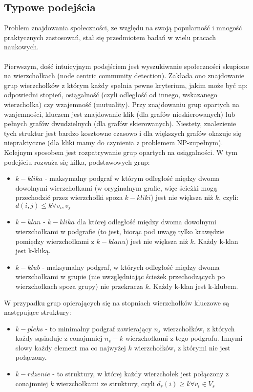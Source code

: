 \documentclass{article}
\begin{document}
\subsection{Typowe podejścia}\label{subsection:typical-approaches}
Problem znajdowania społeczności, ze względu na swoją popularność i mnogość praktycznych zastosowań, stał się przedmiotem badań w wielu pracach naukowych.
\\ \\ 
Pierwszym, dość intuicyjnym podejściem jest wyszukiwanie społeczności skupione na wierzchołkach (node centric community detection). Zakłada ono znajdowanie grup wierzchołków z którym każdy spełnia pewne kryterium, jakim może być np: odpowiedni stopień, osiągalność (czyli odległość od innego, wskazanego wierzchołka) czy wzajemność (mutuality). Przy znajdowaniu grup opartych na  wzajemności, kluczem jest znajdowanie klik (dla grafów nieskierowanych) lub pełnych grafów dwudzielnych (dla grafów skierowanych). Niestety, znalezienie tych struktur jest bardzo kosztowne czasowo i dla większych grafów okazuje się niepraktyczne (dla kliki mamy do czynienia z problemem NP-zupełnym).\\

Kolejnym sposobem jest rozpatrywanie grup opartych na osiągalności. W tym podejściu rozważa się kilka, podstawowych grup:

\begin{itemize}
\item $k-klika$ - maksymalny podgraf w którym odległość między dwoma dowolnymi wierzchołkami (w oryginalnym grafie, więc ścieżki mogą przechodzić przez wierzchołki spoza $k-kliki$) jest nie większa niż $k$, czyli: $d(i,j)\leq k  \forall v_i , v_j $
\item  $k-klan$ - $k-klika$ dla której odległość między dwoma dowolnymi wierzchołkami w podgrafie (to jest, biorąc pod uwagę tylko krawędzie pomiędzy wierzchołkami z $k-klanu$) jest nie większa niż $k$. Każdy k-klan jest k-kliką.
\item $k - klub$ - maksymalny podgraf, w których odległość między dwoma wierzchołkami w grupie (nie uwzględniając ścieżek przechodzących po wierzchołkach spoza grupy) nie przekracza $k$. Każdy k-klan jest k-klubem.
\end{itemize}

W przypadku grup opierających się na stopniach wierzchołków kluczowe są następujące struktury:

\begin{itemize}
\item $k - pleks$ - to minimalny podgraf zawierający $n_s$ wierzchołków, z których każdy sąsiaduje z conajmniej $n_s - k$ wierzchołkami z tego podgrafu. Innymi słowy każdy element ma co najwyżej $k$ wierzchołków, z którymi nie jest połączony.
\item $k - rdzenie$ -  to struktury, w której każdy wierzchołek jest połączony z conajmniej $k$ wierzchołkami ze struktury, czyli  $d_s(i)\geq k \forall v_i \in V_s $
\end{itemize}
\end{document}
